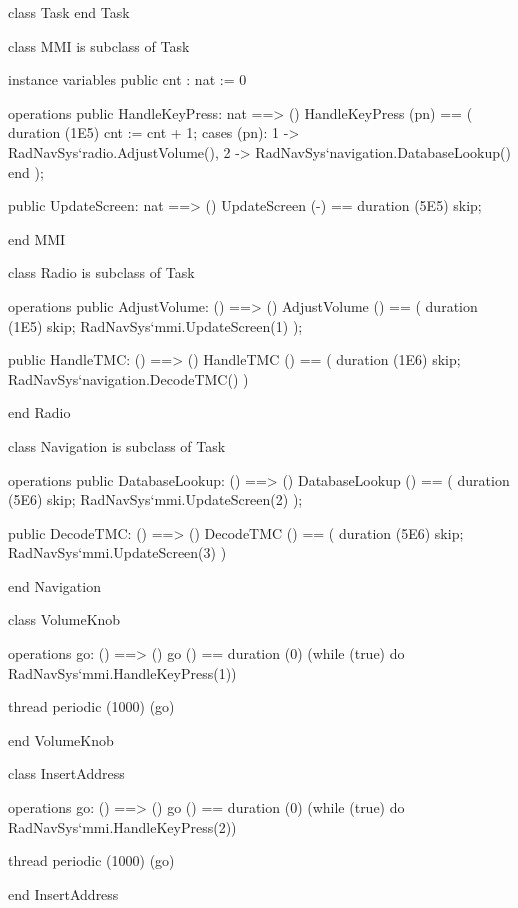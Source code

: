 \begin{vdm_al}
class Task
end Task

class MMI
 is subclass of Task

instance variables
  public cnt : nat := 0

operations
  public HandleKeyPress: nat ==> ()
  HandleKeyPress (pn) ==
    ( duration (1E5) cnt := cnt + 1;
      cases (pn):
        1 -> RadNavSys`radio.AdjustVolume(),
        2 -> RadNavSys`navigation.DatabaseLookup()
      end );

  public UpdateScreen: nat ==> ()
  UpdateScreen (-) ==
    duration (5E5) skip;

end MMI
\end{vdm_al}

\begin{vdm_al}
class Radio
 is subclass of Task

operations
  public AdjustVolume: () ==> ()
  AdjustVolume () ==
    ( duration (1E5) skip;
      RadNavSys`mmi.UpdateScreen(1) );

  public HandleTMC: () ==> ()
  HandleTMC () ==
    ( duration (1E6) skip;
      RadNavSys`navigation.DecodeTMC() )

end Radio
\end{vdm_al}

\begin{vdm_al}
class Navigation
 is subclass of Task

operations
  public DatabaseLookup: () ==> ()
  DatabaseLookup () ==
    ( duration (5E6) skip;
      RadNavSys`mmi.UpdateScreen(2) );

  public DecodeTMC: () ==> ()
  DecodeTMC () ==
    ( duration (5E6) skip;
      RadNavSys`mmi.UpdateScreen(3) )

end Navigation
\end{vdm_al}

\begin{vdm_al}
class VolumeKnob

operations
  go: () ==> ()
  go () ==
    duration (0)
      (while (true) do
        RadNavSys`mmi.HandleKeyPress(1))

thread
  periodic (1000) (go)

end VolumeKnob
\end{vdm_al}

\begin{vdm_al}
class InsertAddress

operations
  go: () ==> ()
  go () ==
    duration (0)
      (while (true) do
        RadNavSys`mmi.HandleKeyPress(2))

thread
  periodic (1000) (go)

end InsertAddress
\end{vdm_al}

